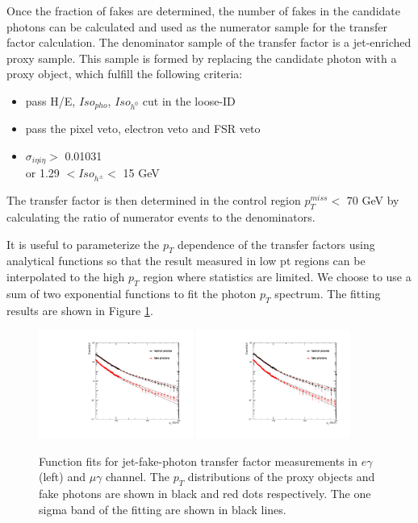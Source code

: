 \documentclass[thesis.tex]{subfiles}
\renewcommand\_{\textunderscore\allowbreak}
\begin{document}
Once the fraction of fakes are determined, the number of fakes in the candidate photons can be calculated and used as the numerator sample for the transfer factor calculation. The denominator sample of the transfer factor is a jet-enriched proxy sample. This sample is formed by replacing the candidate photon with a proxy object, which fulfill the following  criteria:
\begin{center}
\begin{itemize}
\item pass H/E, $Iso_{pho}$, $Iso_{h^0}$ cut in the loose-ID
\item pass the pixel veto, electron veto and FSR veto
\item $\sigma_{i\eta i\eta} >$ 0.01031 \\
     or   1.29 $< Iso_{h^\pm} <$ 15 GeV
\end{itemize}
\end{center}

The transfer factor is then determined in the control region $p_{T}^{miss} <$ 70 GeV by calculating the ratio of numerator events to the denominators.

It is useful to parameterize the $p_T$ dependence of the transfer factors using analytical functions so that the result measured in low pt regions can be interpolated to the high $p_T$ region where statistics are limited. We choose to use a sum of two exponential functions to fit the photon $p_T$ spectrum. The fitting results are shown in Figure \ref{fig:jetFakePt}.

\begin{figure}[hbtp]
  \centering
    \includegraphics[width=0.45\textwidth]{Figures/JetFakeRate_transfer_eg_EB.pdf}
    \includegraphics[width=0.45\textwidth]{Figures/JetFakeRate_transfer_mg_EB.pdf}
  \caption{Function fits for jet-fake-photon transfer factor measurements in $e\gamma$ (left) and $\mu\gamma$ channel. The $p_T$ distributions of the proxy objects and fake photons are shown in black and red dots respectively. The one sigma band of the fitting are shown in black lines.}
    \label{fig:jetFakePt}
\end{figure}
\end{document}
